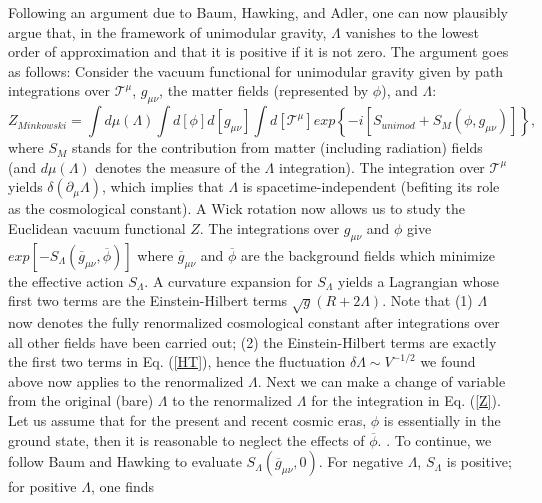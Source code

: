 \documentclass[a4paper]{jpconf}
\begin{document}
Following an argument due to Baum\cite{Baum}, Hawking\cite{Hawk}, 
and Adler\cite{Adler}, 
one can now plausibly argue \cite{PRL} that, in the
framework of unimodular gravity,
$\Lambda$ vanishes to the lowest order of
approximation and that it is positive if it is not zero. 
The argument goes as follows: Consider
the vacuum
functional for unimodular gravity given by path integrations over
$\mathcal{T}^{\mu}$, $g_{\mu \nu}$, the matter fields (represented
by $\phi$), and $\Lambda$:
\begin{equation}
Z_{Minkowski} = \int d\mu (\Lambda) \int d [\phi] d [g_{\mu \nu}] \int d
[{\mathcal T}^{\mu}]  exp \left\{ -i[ S_{unimod} + S_{M}(\phi, g_{\mu
\nu})]\right\}, 
\label{Z}
\end{equation}
where $S_{M}$ stands for the contribution from matter (including 
radiation) fields (and $d \mu
(\Lambda)$ denotes the measure of the $\Lambda$ integration). 
\cite{Adler} The
integration over $\mathcal{T}^{\mu}$ yields $\delta(\partial_{\mu}
\Lambda)$, which implies that $\Lambda$ is spacetime-independent (befiting
its role as the cosmological constant).  A Wick rotation now allows us to
study the Euclidean vacuum functional $Z$.  The integrations over $g_{\mu
\nu}$ and $\phi$ give $exp[-S_{\Lambda}(\overline{g}_{\mu \nu},
\overline{\phi})]$ where $\overline{g}_{\mu \nu}$ and $\overline{\phi}$
are the background fields which minimize the effective action
$S_{\Lambda}$.  A curvature expansion for $S_{\Lambda}$ yields a
Lagrangian whose first two terms are the Einstein-Hilbert terms $\sqrt{g}
(R + 2\Lambda)$.  Note that (1) 
$\Lambda$ now denotes the fully renormalized
cosmological constant after integrations over all other fields have 
been carried out; (2) the Einstein-Hilbert terms are exactly the first
two terms in Eq. (\ref{HT}), hence the fluctuation $\delta \Lambda \sim 
V^{-1/2}$ we found above now applies to the renormalized $\Lambda$.
Next we can make a change of variable from the original
(bare) $\Lambda$ to the renormalized $\Lambda$ 
for the integration in Eq. (\ref{Z}).  Let us assume that for
the present and recent cosmic eras, 
$\phi$ is essentially in the ground state, then
it is reasonable to neglect the effects of $\overline{\phi}$. 
\cite{ngvd01}.  To
continue, we follow Baum\cite{Baum} and Hawking\cite{Hawk} to evaluate
$S_{\Lambda}(\overline{g}_{\mu \nu}, 0)$.  For negative $\Lambda$,
$S_{\Lambda}$ is positive; for positive $\Lambda$, one finds
\end{document}
